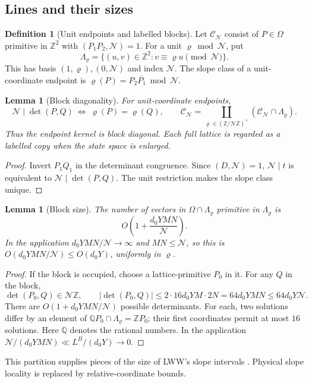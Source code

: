 \documentclass[11pt]{article}
\newtheorem{lemma}[theorem]{Lemma}
\theoremstyle{definition}
\newtheorem{definition}[theorem]{Definition}
\newcommand{\Z}{\mathbb Z}
\newcommand{\Q}{\mathbb Q}
\newcommand{\GN}{\mathcal N}
\newcommand{\CC}{\mathcal C}
\newcommand{\LWW}[1]{\cite[#1]{LWW}}
\theoremstyle{remark}
\numberwithin{equation}{section}
\begin{document}
\subsection{Lines and their sizes}\label{subsec:lines}
\begin{definition}[Unit endpoints and labelled blocks]\label{def:blocks}
Let $\CC_{\GN}$ consist of $P\in\Omega$ primitive in $\Z^2$
with $(P_1P_2,\GN)=1$. For a unit $\varrho\bmod\GN$, put
\begin{equation}\label{eq:lattice}
 \Lambda_\varrho=\{(u,v)\in\Z^2:v\equiv\varrho u\pmod{\GN}\}.
\end{equation}
This has basis $(1,\varrho),(0,\GN)$ and index $\GN$.
The slope class of a unit-coordinate endpoint is
$\varrho(P)=P_2\overline{P_1}\bmod\GN$.
\end{definition}
\begin{lemma}[Block diagonality]\label{lem:blocks}
For unit-coordinate endpoints,
\begin{equation}\label{eq:disjoint-union}
 \GN\mid\det(P,Q)\ \Longleftrightarrow\ \varrho(P)=\varrho(Q),
 \qquad
 \CC_{\GN}=\coprod_{\varrho\in(\Z/\GN\Z)^\times}
      (\CC_{\GN}\cap\Lambda_\varrho).
\end{equation}
Thus the endpoint kernel is block diagonal. Each full lattice is
regarded as a labelled copy when the state space is enlarged.
\end{lemma}
\begin{proof}
Invert $P_1Q_1$ in the determinant congruence. Since $(D,\GN)=1$,
$\GN\mid t$ is equivalent to $\GN\mid\det(P,Q)$.
The unit restriction makes the slope class unique.
\end{proof}
\begin{lemma}[Block size]\label{lem:block-size}
The number of vectors in $\Omega\cap\Lambda_\varrho$ primitive in
$\Lambda_\varrho$ is
\begin{equation}\label{eq:block-size}
 O\left(1+\frac{d_0YMN}{\GN}\right).
\end{equation}
In the application $d_0YMN/\GN\to\infty$ and $MN\le\GN$, so this is
$O(d_0YMN/\GN)\le O(d_0Y)$, uniformly in $\varrho$.
\end{lemma}
\begin{proof}
If the block is occupied, choose a lattice-primitive $P_0$ in it.
For any $Q$ in the block,
\[
 \det(P_0,Q)\in\GN\Z,\qquad
 |\det(P_0,Q)|\le2\cdot16d_0YM\cdot2N
 =64d_0YMN\le64d_0Y\GN.
\]
There are $O(1+d_0YMN/\GN)$ possible determinants. For each, two
solutions differ by an element of
$\Q P_0\cap\Lambda_\varrho=\Z P_0$; their first coordinates permit
at most $16$ solutions. Here $\Q$ denotes the rational numbers.
In the application $\GN/(d_0YMN)\ll L^B/(d_0Y)\to0$.
\end{proof}
This partition supplies pieces of the size of LWW's slope intervals
\LWW{Section~4.6, p.~36}. Physical slope locality is replaced by
relative-coordinate bounds.
\end{document}
